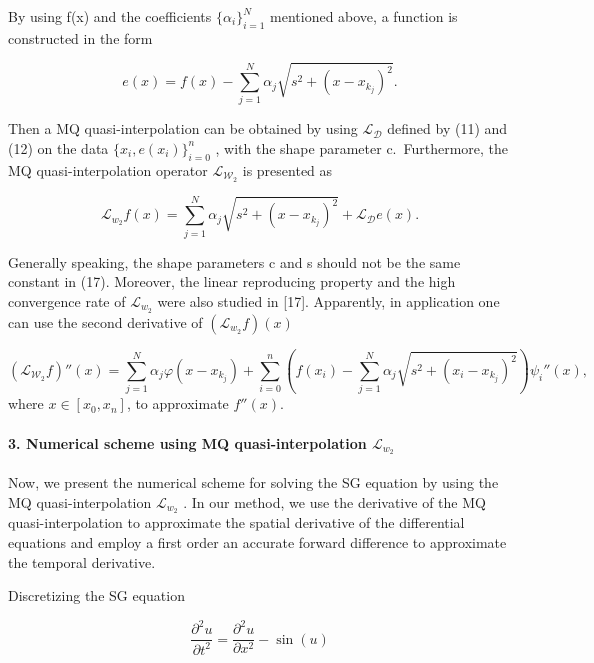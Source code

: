\documentclass[12pt]{article}
\begin{document}
By using f(x) and the coefficients \(\{\alpha_i\}_{i=1}^N\) mentioned above, a function is constructed in the form

\[e(x) = f(x) - \sum_{j=1}^{N} \alpha_j \sqrt{s^2 + (x - x_{k_j})^2}.\tag{16}\]

Then a MQ quasi-interpolation can be obtained by using
\(\mathcal{L}_{\mathcal{D}}\) defined by (11) and (12) on the data \(\{x_i, e(x_i)\}_{i=0}^n\) , with the shape parameter c.~Furthermore, the MQ quasi-interpolation operator \(\mathcal{L}_{\mathcal{W}_2}\) is presented as

\[\mathcal{L}_{w_2} f(x) = \sum_{j=1}^{N} \alpha_j \sqrt{s^2 + (x - x_{k_j})^2} + \mathcal{L}_{\mathcal{D}} e(x).\tag{17}\]

Generally speaking, the shape parameters c and s should not be the same constant in (17). Moreover, the linear reproducing property and the high convergence rate of \(\mathcal{L}_{w_2}\) were also studied in {[}17{]}.
Apparently, in application one can use the second derivative of \((\mathcal{L}_{w_2}f)(x)\)

\[(\mathcal{L}_{\mathcal{W}_2} f)''(x) = \sum_{j=1}^N \alpha_j \varphi(x - x_{k_j}) + \sum_{i=0}^n \left( f(x_i) - \sum_{j=1}^N \alpha_j \sqrt{s^2 + (x_i - x_{k_j})^2} \right) \psi_i''(x),\tag{17A}\]
where \(x \in [x_0, x_n]\), to approximate \(f''(x)\).

\hypertarget{numerical-scheme-using-mq-quasi-interpolation-mathcall_w_2}{%
\paragraph[3. Numerical scheme using MQ quasi-interpolation
\(\mathcal{L}_{w_2}\)]{\texorpdfstring{\protect\hypertarget{page-3-0}{}{}3.
Numerical scheme using MQ quasi-interpolation \(\mathcal{L}_{w_2}\)}{3. Numerical scheme using MQ quasi-interpolation \textbackslash mathcal\{L\}\_\{w\_2\}}}\label{numerical-scheme-using-mq-quasi-interpolation-mathcall_w_2}}

Now, we present the numerical scheme for solving the SG equation by using the MQ quasi-interpolation \(\mathcal{L}_{w_2}\) . In our method, we use the derivative of the MQ quasi-interpolation to approximate the spatial derivative of the differential equations and employ a first
order an accurate forward difference to approximate the temporal derivative.

Discretizing the SG equation

\[\frac{\partial^2 u}{\partial t^2} = \frac{\partial^2 u}{\partial x^2} - \sin(u)\]
\end{document}
